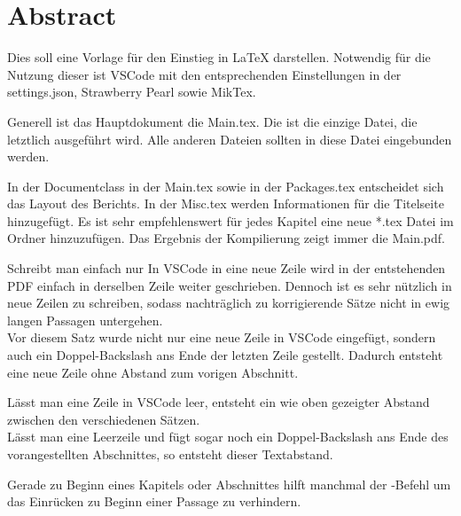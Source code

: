 \chapter*{Abstract}
Dies soll eine Vorlage für den Einstieg in LaTeX darstellen.
Notwendig für die Nutzung dieser ist VSCode mit den entsprechenden Einstellungen in der settings.json, Strawberry Pearl sowie MikTex.

Generell ist das Hauptdokument die Main.tex. Die ist die einzige Datei, die letztlich ausgeführt wird. Alle anderen Dateien sollten in diese Datei eingebunden werden.

In der Documentclass in der Main.tex sowie in der Packages.tex entscheidet sich das Layout des Berichts. In der Misc.tex werden Informationen für die Titelseite hinzugefügt.
Es ist sehr empfehlenswert für jedes Kapitel eine neue *.tex Datei im Ordner  hinzuzufügen. Das Ergebnis der Kompilierung zeigt immer die Main.pdf.

Schreibt man einfach nur In VSCode in eine neue Zeile wird in der entstehenden PDF einfach in derselben Zeile weiter geschrieben.
Dennoch ist es sehr nützlich in neue Zeilen zu schreiben, sodass nachträglich zu korrigierende Sätze nicht in ewig langen Passagen untergehen. \\
Vor diesem Satz wurde nicht nur eine neue Zeile in VSCode eingefügt, sondern auch ein Doppel-Backslash \gans{\textbackslash\textbackslash} ans Ende der letzten Zeile gestellt. Dadurch entsteht eine neue Zeile ohne Abstand zum vorigen Abschnitt.

Lässt man eine Zeile in VSCode leer, entsteht ein wie oben gezeigter Abstand zwischen den verschiedenen Sätzen.\\

Lässt man eine Leerzeile und fügt sogar noch ein Doppel-Backslash \gans{\textbackslash\textbackslash} ans Ende des vorangestellten Abschnittes, so entsteht dieser Textabstand.

Gerade zu Beginn eines Kapitels oder Abschnittes hilft manchmal der -Befehl um das Einrücken zu Beginn einer Passage zu verhindern.

\cleardoublepage